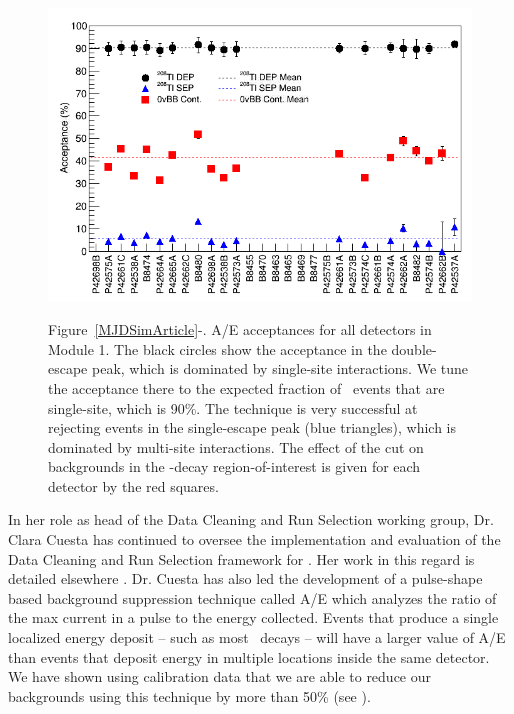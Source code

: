 \begin{figure}
\begin{center}
\hfil  \includegraphics[width=.48\textwidth]{DS1_AoverECut_Efficiency_160330.png} \hfil 

\end{center}
 \hfil \parbox{.5\textwidth}{\small Figure~\ref{MJDSimArticle}-. A/E acceptances for all detectors in Module 1. The black circles show the acceptance in the  double-escape peak, which is dominated by single-site interactions. We tune the acceptance there to the expected fraction of \nonubb\ events that are single-site, which is 90\%. The technique is very successful at rejecting events in the  single-escape peak (blue triangles), which is dominated by multi-site interactions. The effect of the cut on backgrounds in the  \nonubb-decay region-of-interest is given for each detector by the red squares. }  \hfil

\label{AoE}  %

\end{figure}

In her role as head of the Data Cleaning and Run Selection working group, Dr. Clara Cuesta has continued to oversee the implementation and evaluation of the Data Cleaning and Run Selection framework for \MJ. Her work in this regard is detailed elsewhere \secref{}.\newline
\indent Dr. Cuesta has also led the development of a pulse-shape based background suppression technique called A/E which analyzes the ratio of the max current in a pulse to the energy collected. Events that produce a single localized energy deposit \--- such as most \nonubb\ decays \--- will have a larger value of A/E than events that deposit energy in multiple locations inside the same detector. We have shown using  calibration data that we are able to reduce our backgrounds using this technique by more than 50\% (see ).

